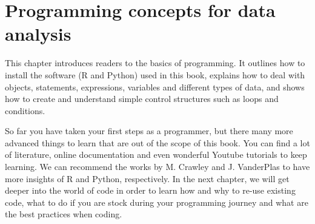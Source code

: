\chapter{Programming concepts for data analysis}

This chapter introduces readers to the basics of programming. It
outlines how to install the software (R and Python) used in this book,
explains how to deal with objects, statements, expressions, variables
and different types of data, and shows how to create and understand
simple control structures such as loops and conditions.










So far you have taken your first steps as a programmer, but there many more advanced things to learn that are out of the scope of this book. You can find a lot of literature, online documentation and even wonderful Youtube tutorials to keep learning. We can recommend the works by M. Crawley\cite{crawley2012r}  and J. VanderPlas\cite{vanderplas2016python}  to have more insights of R and Python, respectively. In the next chapter, we will get deeper into the world of code in order to learn how and why to re-use existing code, what to do if you are stock during your programming journey and what are the best practices when coding.

